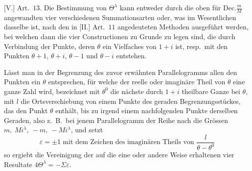 [V.] Art.\ $13$. Die Bestimmung von $\Theta^\lambda$ kann entweder durch die oben für $\mathrm{Dec.}\frac mM$ angewandten vier verschiedenen Summationsarten oder, was im Wesentlichen dasselbe ist, nach den in [II.] Art.\ $11$ angedeuteten Methoden ausgeführt werden, bei welchen dann die vier Constructionen zu Grunde zu legen sind, die durch Verbindung der Punkte, deren $\theta$ ein Vielfaches von $1+i$ ist, resp.\ mit den Punkten $\theta+1$, $\theta+i$, $\theta-1$ und $\theta-i$ entstehen.

Lässt man in der Begrenzung des zuvor erwähnten Parallelogramms allen den Punkten ein $\theta$ entsprechen, für welche der reelle oder imaginäre Theil von $\theta$ eine ganze Zahl wird, bezeichnet mit $\theta^0$ die nächste durch $1+i$ theilbare Ganze bei $\theta$, mit $l$ die Ortsverschiebung von einem Punkte des geraden Begrenzungsstückes, das den Punkt $\theta$ enthält, bis zu irgend einem nachfolgenden Punkte derselben Geraden, also z.\ B.\ bei jenem Parallelogramm der Reihe nach die Grössen $m,\ Mi^\lambda,\ -m,\ -Mi^\lambda$, und setzt
\[
\varepsilon=\pm1\text{ mit dem Zeichen des imaginären Theils von }\frac l{\theta-\theta^0}
\]
so ergiebt die Vereinigung der auf die eine oder andere Weise erhaltenen vier Resultate $4\Theta^\lambda=-\Sigma\varepsilon$.

